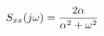 \documentclass[preview]{standalone}
\begin{document}
\begin{align*}
\special{dvisvgm:raw <g id='unique000'>}S_{xx}(j\omega)=\frac{2\alpha}{\alpha^2+\omega^2}\special{dvisvgm:raw </g>}
\end{align*}
\end{document}
